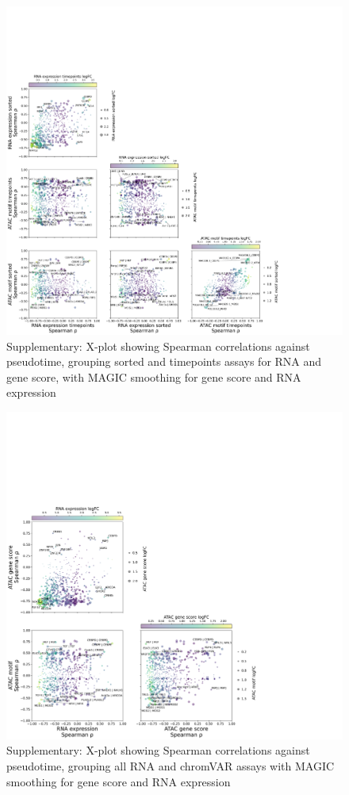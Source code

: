 \documentclass[a4paper]{article}
\begin{document}
\begin{figure}[!htb]
  \centering
  \includegraphics[width=\textwidth]{../figures/hematopoiesis/Neutrophil_40_106_smooth_magic_semi_detailed_X_plot.png}
  \caption{Supplementary: X-plot showing Spearman correlations against pseudotime, grouping sorted and timepoints assays for RNA and gene score, with MAGIC smoothing for gene score and RNA expression}
\end{figure}

\begin{figure}[!htb]
  \centering
  \includegraphics[width=\textwidth]{../figures/hematopoiesis/Neutrophil_40_106_smooth_magic_grouped_X_plot.png}
  \caption{Supplementary: X-plot showing Spearman correlations against pseudotime, grouping all RNA and chromVAR assays with MAGIC smoothing for gene score and RNA expression}
\end{figure}
\end{document}
